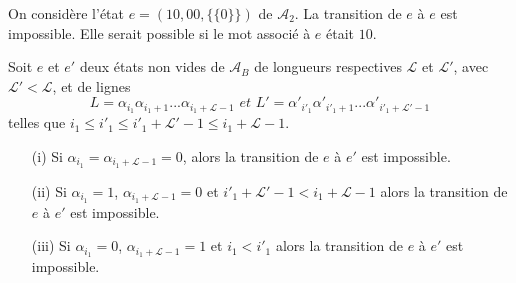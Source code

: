 \begin{Ex}\label{exdec191}
On considère l'état $e = (10,00,\{\{0\}\})$ de  $\mathcal{A}_{2}$.  La transition de  $e$ à $e$ est impossible. Elle serait possible si le mot associé à $e$ était $10$.
\end{Ex}
\begin{Prop}\label{prop2606221}
Soit $e$ et $e'$ deux états non vides de $\mathcal{A}_{B}$ de longueurs respectives $\mathcal{L}$ et $\mathcal{L}'$, avec $\mathcal{L}'< \mathcal{L}$, et de lignes $$L=\alpha_{i_{1}}\alpha_{i_{1}+1}...\alpha_{i_{1}+\mathcal{L}-1} \textit{  et  }L'=\alpha'_{i'_{1}}\alpha'_{i'_{1}+1}...\alpha'_{i'_{1}+\mathcal{L}'-1}$$  telles que  $i_{1}\leq i'_{1}\leq i'_{1}+\mathcal{L}'-1 \leq i_{1}+\mathcal{L}-1 $.
 \begin{itemize}
 \item[(i)] Si $\alpha_{i_{1}}= \alpha_{i_{1}+\mathcal{L}-1}=0$, alors la transition de $e$ à $e'$ est impossible.
 \item[(ii)] Si $\alpha_{i_{1}}=1$, $\alpha_{i_{1}+\mathcal{L}-1}=0$  et $i'_{1}+\mathcal{L}'-1 < i_{1}+\mathcal{L}-1 $ alors la transition de $e$ à $e'$ est impossible.
 \item[(iii)] Si $\alpha_{i_{1}}=0$, $\alpha_{i_{1}+\mathcal{L}-1}=1$ et  $i_{1} < i'_{1} $ alors la transition de $e$ à $e'$ est impossible.
\end{itemize}
\end{Prop}
